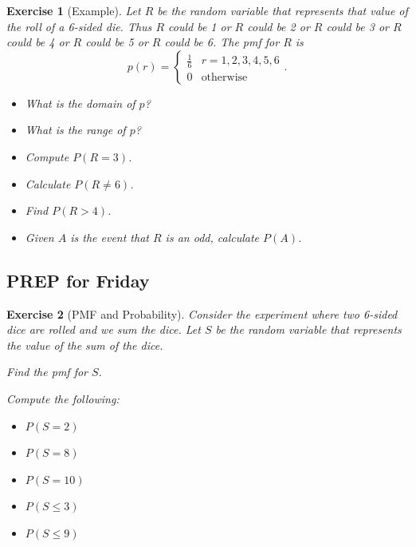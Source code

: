 \documentclass{article}
\theoremstyle{plain}
\theoremstyle{box}
\newtheorem*{exercise*}{Exercise}
\begin{document}
\begin{exercise*}[Example]
Let $R$ be the random variable that represents that value of the roll of a 6-sided die. Thus $R$ could be 1 or $R$ could be 2 or $R$ could be 3 or $R$ could be 4 or $R$ could be 5 or $R$ could be 6. The pmf for $R$ is 
      $$p(r) = 
    \begin{cases}
    \frac{1}{6} & r=1,2,3,4,5,6 \\
    0 & \text{otherwise}
    \end{cases}.$$

\begin{itemize}
\item What is the domain of $p$?
\item What is the range of $p$?
\item Compute $P(R = 3)$.
\item Calculate $P(R \neq 6)$.
\item Find $P(R > 4)$.
\item Given $A$ is the event that $R$ is an odd, calculate $P(A)$.
\end{itemize}
\end{exercise*}



\newpage
\subsection{PREP for Friday}
\begin{exercise*}[PMF and Probability]
Consider the experiment where two 6-sided dice are rolled and we sum the dice. Let $S$ be the random variable that represents the value of the sum of the dice.
\item Find the pmf for $S$.
\item Compute the following:
\begin{itemize}
\item $P(S = 2)$
\item $P(S = 8)$
\item $P(S = 10)$
\item $P(S \leq 3)$
\item $P(S \leq 9)$
\end{itemize}
\end{exercise*}
 
\end{document}
